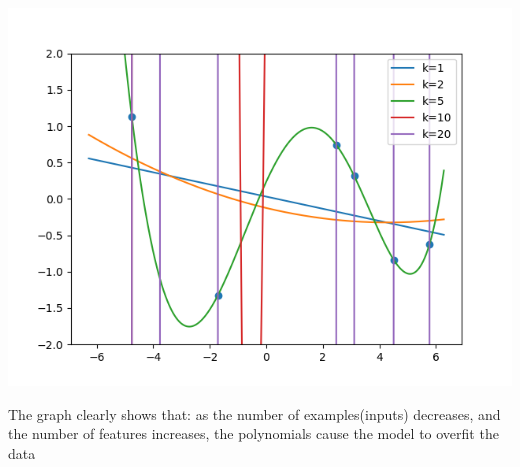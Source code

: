 \begin{answer}

\includegraphics{part_small}

The graph clearly shows that: as the number of examples(inputs) decreases, and the number of features increases, the polynomials cause the model to overfit the data

\end{answer}
